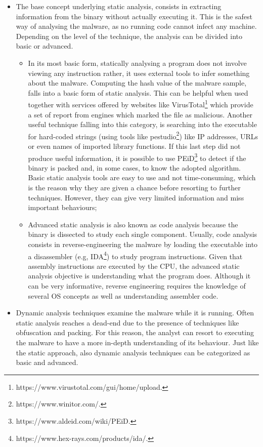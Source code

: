 \documentclass[LaM,binding=0.6cm]{sapthesis}
\begin{document}
\begin{itemize}
\item The base concept underlying static analysis, consists in extracting information from the binary without actually executing it. This is the safest way of analysing the malware, as no running code cannot infect any machine. Depending on the level of the technique, the analysis can be divided into basic or advanced.
\begin{itemize}
\item In its most basic form, statically analysing a program does not involve viewing any instruction rather, it uses external tools to infer something about the malware. Computing the hash value of the malware sample, falls into a basic form of static analysis. This can be helpful when used together with services offered by websites like VirusTotal\footnote{https://www.virustotal.com/gui/home/upload.} which provide a set of report from engines which marked the file as malicious. Another useful technique falling into this category, is searching into the executable for hard-coded strings (using tools like pestudio\footnote{https://www.winitor.com/.}) like IP addresses, URLs or even names of imported library functions. If this last step did not produce useful information, it is possible to use PEiD\footnote{https://www.aldeid.com/wiki/PEiD.} to detect if the binary is packed and, in some cases, to know the adopted algorithm. Basic static analysis tools are easy to use and not time-consuming, which is the reason why they are given a chance before resorting to further techniques. However, they can give very limited information and miss important behaviours;
\item Advanced static analysis is also known as code analysis because the binary is dissected to study each single component. Usually, code analysis consists in reverse-engineering the malware by loading the executable into a disassembler (e.g, IDA\footnote{https://www.hex-rays.com/products/ida/.}) to study program instructions. Given that assembly instructions are executed by the CPU, the advanced static analysis objective is understanding what the program does. Although it can be very informative, reverse engineering requires the knowledge of several OS concepts as well as understanding assembler code.
\end{itemize}
\item Dynamic analysis techniques examine the malware while it is running. Often static analysis reaches a dead-end due to the presence of techniques like obfuscation and packing. For this reason, the analyst can resort to executing the malware to have a more in-depth understanding of its behaviour. Just like the static approach, also dynamic analysis techniques can be categorized as basic and advanced.

\end{itemize}
\end{document}
